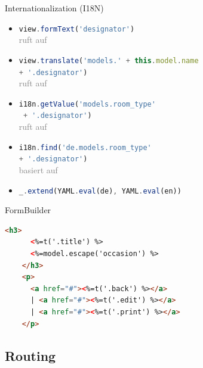 \begin{Frame}{Internationalization (I18N)}
  \begin{itemize}
    \item \lstinline[language=JavaScript]-view.formText('designator')-\\
      \textcolor<presentation>{gray}{ruft auf}\strut
    \item \lstinline[language=JavaScript]-view.translate('models.' + this.model.name-\\
       \lstinline[language=JavaScript]-+ '.designator')-\\
      \textcolor<presentation>{gray}{ruft auf}\strut
    \item \lstinline[language=JavaScript]-i18n.getValue('models.room_type'-\\
       \lstinline[language=JavaScript]- + '.designator')-\\
      \textcolor<presentation>{gray}{ruft auf}\strut
    \item \lstinline[language=JavaScript]-i18n.find('de.models.room_type'- \\
       \lstinline[language=JavaScript]-+ '.designator')-\\
      \textcolor<presentation>{gray}{basiert auf}\strut
    \item \lstinline[language=JavaScript]-_.extend(YAML.eval(de), YAML.eval(en))-
  \end{itemize}
\end{Frame}

\begin{Frame}[fragile]{FormBuilder}
  \begin{lstlisting}[language=HTML,gobble=4]
    <h3>
      <%=t('.title') %>
      <%=model.escape('occasion') %>
    </h3>
    <p>
      <a href="#"><%=t('.back') %></a>
      | <a href="#"><%=t('.edit') %></a>
      | <a href="#"><%=t('.print') %></a>
    </p>
  \end{lstlisting}
\end{Frame}

\subsection{Routing}

